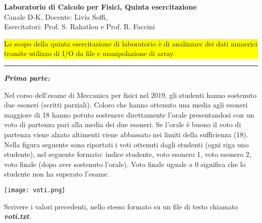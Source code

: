 \documentclass[12pt]{article}
\begin{document}
\pagestyle{empty}

\begin{center}
{\Large \bf  Laboratorio di Calcolo per Fisici, Quinta esercitazione\\[2mm]}
{\large Canale D-K, Docente: Livia Soffi, \\Esercitatori: Prof. S. Rahatlou e Prof. R. Faccini}
\end{center}
\vspace{4mm}

\colorbox{yellow}{\begin{minipage}{17cm}
  Lo scopo della quinta esercitazione di laboratorio \`e di analizzare dei dati numerici tramite utilizzo di I/O da file e manipolazione di array.
\end{minipage}}
\vspace{2mm}
%
%

\hrule
\vspace{2mm}
\textbf{\emph{Prima parte:}}

Nel corso dell'esame di Meccanica per fisici nel 2019, gli studenti hanno sostenuto due esoneri (scritti parziali). Coloro che hanno ottenuto una media agli esoneri maggiore di 18 hanno potuto sostenere direttamente l'orale presentandosi con un voto di partenza pari alla media dei due esoneri. Se l'orale \`e buono il voto di partenza viene alzato altimenti viene abbassato nei limiti della sufficienza (18). Nella figura seguente sono riportati i voti ottenuti dagli studenti (ogni riga uno studente), nel seguente formato: indice studente, voto esonero 1, voto esonero 2, voto finale (dopo aver sostenuto l'orale). Voto finale uguale a 0 significa che lo studente non ha superato l'esame.

\begin{center}
    \texttt{[image: voti.png]}
\end{center}


Scrivere i valori precedenti, nello stesso formato su un file di testo chiamato \textbf{\emph{voti.txt}}.
\end{document}
